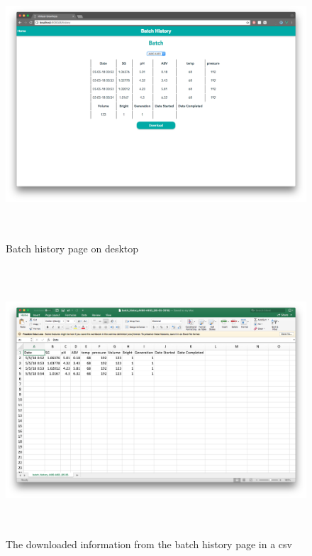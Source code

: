 \documentclass[draftclsnofoot,onecolumn,letterpaper,10pt,compsoc]{IEEEtran}
\begin{document}
\begin{figure}
  \centering
  \centerline{\includegraphics[height=10cm]{screenshots/desktop/batch_history.png}}
  \caption{Batch history page on desktop}
\end{figure}
\begin{figure}
  \centering
  \centerline{\includegraphics[height=10cm]{screenshots/desktop/csv.png}}
  \caption{The downloaded information from the batch history page in a csv}
\end{figure}
\end{document}
